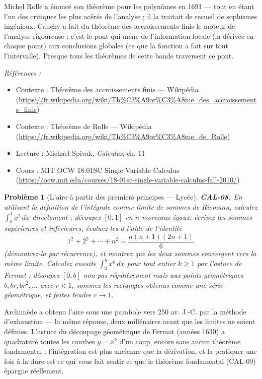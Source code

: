\documentclass[11pt]{article}
\newtheorem{problem}{Problème}
\newenvironment{refs}{\par\small\noindent\emph{Références :}\begin{itemize}\setlength\itemsep{0pt}}{\end{itemize}\normalsize}
\begin{document}
\noindent Michel Rolle a énoncé son théorème pour les polynômes en 1691 --- tout en étant
l'un des critiques les plus acérés de l'analyse ; il la traitait de recueil de sophismes ingénieux.
Cauchy a fait du théorème des accroissements finis le moteur de l'analyse rigoureuse : c'est le pont qui mène de
l'information locale (la dérivée en chaque point) aux conclusions globales (ce que la fonction
a fait sur tout l'intervalle). Presque tous les théorèmes de cette bande traversent ce pont.

\begin{refs}
\item Contexte : Théorème des accroissements finis --- Wikipédia (\url{https://fr.wikipedia.org/wiki/Th%C3%A9or%C3%A8me_des_accroissements_finis})
\item Contexte : Théorème de Rolle --- Wikipédia (\url{https://fr.wikipedia.org/wiki/Th%C3%A9or%C3%A8me_de_Rolle})
\item Lecture : Michael Spivak, \textit{Calculus}, ch. 11
\item Cours : MIT OCW 18.01SC Single Variable Calculus (\url{https://ocw.mit.edu/courses/18-01sc-single-variable-calculus-fall-2010/})
\end{refs}

\bigskip

\begin{problem}[{L'aire à partir des premiers principes --- Lycée}]
\textbf{CAL-08.} En utilisant la définition de l'intégrale comme limite de
sommes de Riemann, calculez $ \int_0^1 x^2\,dx $ directement : découpez $ [0,1] $ en $ n $
morceaux égaux, écrivez les sommes supérieures et inférieures, évaluez-les à l'aide de l'identité
\[ 1^2 + 2^2 + \cdots + n^2 = \frac{n(n+1)(2n+1)}{6} \]
(démontrez-la par récurrence), et montrez que les deux sommes convergent vers la même limite. Calculez ensuite
$ \int_0^b x^k\,dx $ pour tout entier $ k \ge 1 $ par l'astuce de Fermat : découpez
$ [0,b] $ non pas régulièrement mais aux points géométriques $ b, br, br^2, \dots $ avec
$ r<1 $, sommez les rectangles obtenus comme une série géométrique, et faites tendre $ r\to 1 $.
\end{problem}

\noindent Archimède a obtenu l'aire sous une parabole vers 250 av. J.-C. par la
méthode d'exhaustion --- la même réponse, deux millénaires avant que les limites ne soient définies. L'astuce
du découpage géométrique de Fermat (années 1630) a quadraturé toutes les courbes $ y=x^k $ d'un coup, encore
sans aucun théorème fondamental : l'intégration est plus ancienne que la dérivation, et la pratiquer
une fois à la dure est ce qui vous fait sentir ce que le théorème fondamental (CAL-09) épargne réellement.
\end{document}
